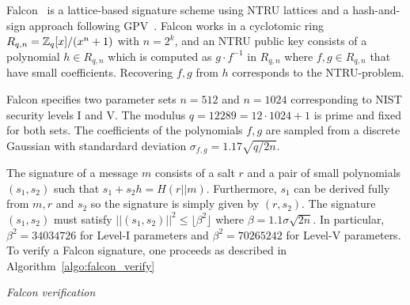 Falcon~\cite{falcon} is a lattice-based signature scheme using NTRU lattices and a hash-and-sign approach following GPV~\cite{}.
Falcon works in a cyclotomic ring $R_{q,n} =  \mathbb{Z}_q[x]/(x^n+1)$ with $n = 2^k$, and an NTRU public key consists 
of a polynomial $h \in R_{q,n}$ which is computed as $g \cdot f^{-1}$ in $R_{q,n}$ where $f,g \in R_{q,n}$ that have small coefficients.
Recovering $f, g$ from $h$ corresponds to the NTRU-problem.  

Falcon specifies two parameter sets $n = 512$ and $n = 1024$ corresponding to NIST security levels I and V.  The modulus 
$q = 12289 = 12 \cdot 1024 + 1$ is prime and fixed for both sets.  The coefficients of the polynomials $f,g$ are sampled
from a discrete Gaussian with standardard deviation $\sigma_{f,g} = 1.17 \sqrt{q/2n}$.

The signature of a message $m$ consists of a salt $r$ and a pair of small polynomials $(s_1, s_2)$ such that 
$s_1 + s_2 h = H(r || m)$.  Furthermore, $s_1$ can be derived fully from $m , r$ and $s_2$ so the signature
is simply given by $(r, s_2)$.  The signature $(s_1,s_2)$ must satisfy $||(s_1,s_2)||^2 \leq \lfloor \beta^2 \rfloor$ where
$\beta = 1.1 \sigma \sqrt{2n}$.  In particular, $\beta^2 = 34034726$ for Level-I parameters and $\beta^2 = 70265242$
for Level-V parameters.  To verify a Falcon signature, one proceeds as described in Algorithm~\ref{algo:falcon_verify}

\begin{algorithm}[!ht] \label{algo:falcon_verify}
\begin{scriptsize}
\caption{\emph{Falcon verification}}
\end{scriptsize}
\end{algorithm} 
